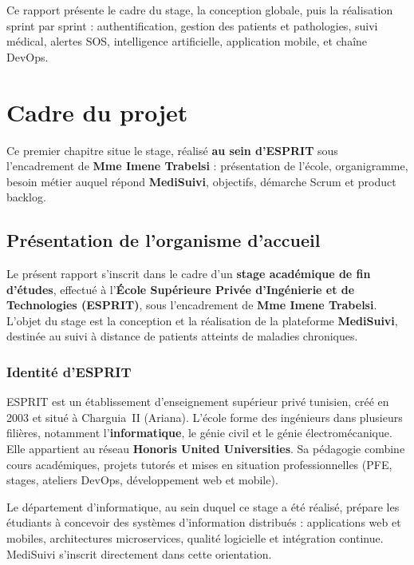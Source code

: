 \documentclass[12pt,a4paper,oneside]{report}
\begin{document}
Ce rapport présente le cadre du stage, la conception globale, puis la réalisation sprint par sprint : authentification, gestion des patients et pathologies, suivi médical, alertes SOS, intelligence artificielle, application mobile, et chaîne DevOps.

\chapter{Cadre du projet}

Ce premier chapitre situe le stage, réalisé \textbf{au sein d'ESPRIT} sous l'encadrement de \textbf{Mme Imene Trabelsi} : présentation de l'école, organigramme, besoin métier auquel répond \textbf{MediSuivi}, objectifs, démarche Scrum et product backlog.

\section{Présentation de l'organisme d'accueil}

Le présent rapport s'inscrit dans le cadre d'un \textbf{stage académique de fin d'études}, effectué à l'\textbf{École Supérieure Privée d'Ingénierie et de Technologies (ESPRIT)}, sous l'encadrement de \textbf{Mme Imene Trabelsi}. L'objet du stage est la conception et la réalisation de la plateforme \textbf{MediSuivi}, destinée au suivi à distance de patients atteints de maladies chroniques.

\subsection{Identité d'ESPRIT}
ESPRIT est un établissement d'enseignement supérieur privé tunisien, créé en 2003 et situé à Charguia~II (Ariana). L'école forme des ingénieurs dans plusieurs filières, notamment l'\textbf{informatique}, le génie civil et le génie électromécanique. Elle appartient au réseau \textbf{Honoris United Universities}. Sa pédagogie combine cours académiques, projets tutorés et mises en situation professionnelles (PFE, stages, ateliers DevOps, développement web et mobile).

Le département d'informatique, au sein duquel ce stage a été réalisé, prépare les étudiants à concevoir des systèmes d'information distribués : applications web et mobiles, architectures microservices, qualité logicielle et intégration continue. MediSuivi s'inscrit directement dans cette orientation.
\end{document}
